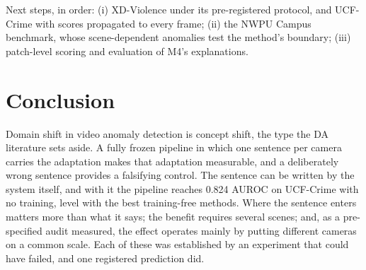 \documentclass[conference]{IEEEtran}
\begin{document}
Next steps, in order: (i) XD-Violence under its pre-registered protocol, and
UCF-Crime with scores propagated to every frame; (ii) the NWPU Campus benchmark,
whose scene-dependent anomalies test the method's boundary; (iii) patch-level
scoring and evaluation of M4's explanations.

\section{Conclusion}

Domain shift in video anomaly detection is concept shift, the type the DA
literature sets aside. A fully frozen pipeline in which one sentence per camera
carries the adaptation makes that adaptation measurable, and a deliberately
wrong sentence provides a falsifying control. The sentence can be written by the
system itself, and with it the pipeline reaches 0.824 AUROC on UCF-Crime with no
training, level with the best training-free methods. Where the sentence enters
matters more than what it says; the benefit requires several scenes; and, as a
pre-specified audit measured, the effect operates mainly by putting different
cameras on a common scale. Each of these was established by an experiment that
could have failed, and one registered prediction did.



\end{document}
